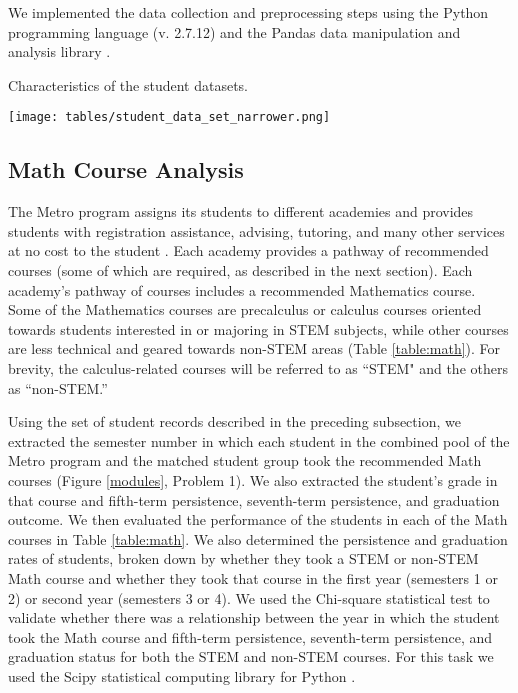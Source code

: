 \documentclass[conference]{IEEEtran}
\begin{document}
We implemented the data collection and preprocessing steps using the Python programming language (v. 2.7.12) and the Pandas data manipulation and analysis library \cite{Pandas}.        

\begin{table}[htbp]
\centering
\caption{Characteristics of the student datasets.}
\texttt{[image: tables/student\_data\_set\_narrower.png]}
\label{table:students}
\end{table}

\subsection{Math Course Analysis}

The Metro program assigns its students to different academies and provides students with registration assistance, advising, tutoring, and many other services at no cost to the student \cite{Metrowebsite}.  %
Each academy provides a pathway of recommended courses (some of which are required, as described in the next section). Each academy's pathway of courses includes a recommended Mathematics course.  Some of the Mathematics courses are precalculus or calculus courses oriented towards students interested in or majoring in STEM subjects, while other courses are less technical and geared towards non-STEM areas (Table \ref{table:math}).  For brevity, the calculus-related courses will be referred to as ``STEM" and the others as ``non-STEM.''  

Using the set of student records described in the preceding subsection, we extracted the semester number in which each student in the combined pool of the Metro program and the matched student group took the recommended Math courses (Figure \ref{modules}, Problem 1).  We also extracted the student's grade in that course and fifth-term persistence, seventh-term persistence, and graduation outcome.  We then evaluated the performance of the students in each of the Math courses in Table \ref{table:math}.  We also determined the persistence and graduation rates of students, broken down by whether they took a STEM or non-STEM Math course and whether they took that course in the first year (semesters 1 or 2) or second year (semesters 3 or 4).  We used the Chi-square statistical test to validate whether there was a relationship between the year in which the student took the Math course and fifth-term persistence, seventh-term persistence, and graduation status for both the STEM and non-STEM courses.  For this task we used the Scipy statistical computing library for Python \cite{Scipy}.
\end{document}
